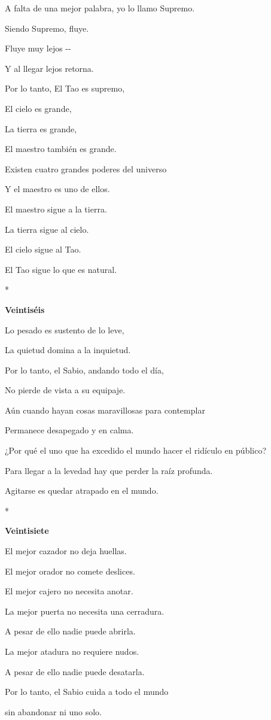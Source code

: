 A falta de una mejor palabra, yo lo llamo Supremo.

Siendo Supremo, fluye.

Fluye muy lejos -\/-

Y al llegar lejos retorna.

Por lo tanto, El Tao es supremo,

El cielo es grande,

La tierra es grande,

El maestro también es grande.

Existen cuatro grandes poderes del universo

Y el maestro es uno de ellos.

El maestro sigue a la tierra.

La tierra sigue al cielo.

El cielo sigue al Tao.

El Tao sigue lo que es natural.

*

\textbf{Veintiséis}

Lo pesado es sustento de lo leve,

La quietud domina a la inquietud.

Por lo tanto, el Sabio, andando todo el día,

No pierde de vista a su equipaje.

Aún cuando hayan cosas maravillosas para contemplar

Permanece desapegado y en calma.

¿Por qué el uno que ha excedido el mundo hacer el ridículo en público?

Para llegar a la levedad hay que perder la raíz profunda.

Agitarse es quedar atrapado en el mundo.

*

\textbf{Veintisiete}

El mejor cazador no deja huellas.

El mejor orador no comete deslices.

El mejor cajero no necesita anotar.

La mejor puerta no necesita una cerradura.

A pesar de ello nadie puede abrirla.

La mejor atadura no requiere nudos.

A pesar de ello nadie puede desatarla.

Por lo tanto, el Sabio cuida a todo el mundo

sin abandonar ni uno solo.

